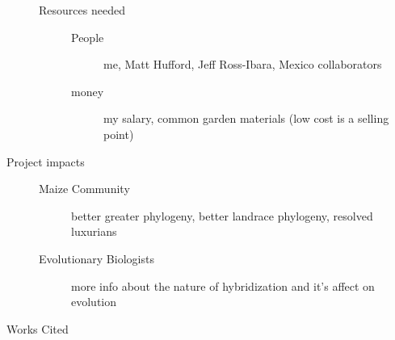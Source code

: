 \documentclass[11pt]{amsart}
\begin{document}
\begin{description}
\begin{description}
\begin{description}
				\end{description}
			\item[Resources needed]
				\begin{description}
					\item[People] me, Matt Hufford, Jeff Ross-Ibara, Mexico collaborators
					\item[money] my salary, common garden materials (low cost is a selling point)
				\end{description}
		\end{description}
	\item[Project impacts] \hfill
		\begin{description}
			\item[Maize Community] better greater phylogeny, better landrace phylogeny, resolved luxurians
			\item[Evolutionary Biologists] more info about the nature of hybridization and it's affect on evolution
		\end{description}
	\item[Works Cited] 
\end{description}
\end{document}
